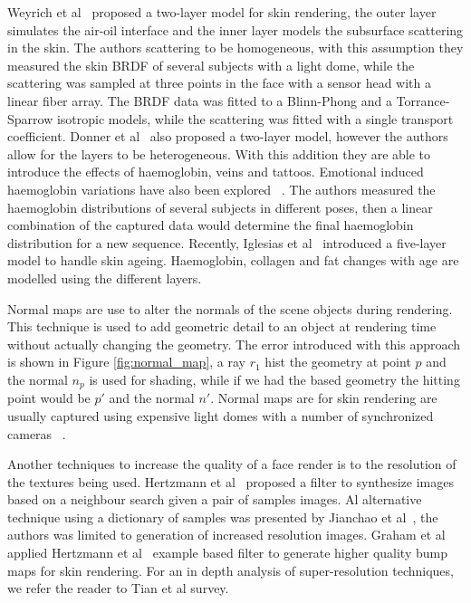 \documentclass[11pt]{report}
\begin{document}
Weyrich et al~\cite{Weyrich2006} proposed a two-layer model for skin rendering, the outer layer simulates the air-oil interface and the inner layer models the subsurface scattering in the skin.
The authors scattering to be homogeneous, with this assumption they measured the skin BRDF of several subjects with a light dome, while the scattering was sampled at three points in the face with a sensor head with a linear fiber array.
The BRDF data was fitted to a Blinn-Phong and a Torrance-Sparrow isotropic models, while the scattering was fitted with a single transport coefficient.
Donner et al~\cite{Donner2008} also proposed a two-layer model, however the authors allow for the layers to be heterogeneous.
With this addition they are able to introduce the effects of haemoglobin, veins and tattoos.
Emotional induced haemoglobin variations have also been explored ~\cite{Jimenez2010}.
The authors measured the haemoglobin distributions of several subjects in different poses, then a linear combination of the captured data would determine the final haemoglobin distribution for a new sequence.
Recently, Iglesias et al~\cite{Iglesias2015} introduced a five-layer model to handle skin ageing.
Haemoglobin, collagen and fat changes with age are modelled using the different layers.

Normal maps are use to alter the normals of the scene objects during rendering.
This technique is used to add geometric detail to an object at rendering time without actually changing the geometry.
The error introduced with this approach is shown in Figure \ref{fig:normal_map}, a ray $r_1$ hist the geometry at point $p$ and the normal $n_p$ is used for shading, while if we had the based geometry the hitting point would be $p'$ and the normal $n'$.
Normal maps are for skin rendering are usually captured using expensive light domes with a number of synchronized cameras ~\cite{Graham2013, Weyrich2006}. 

Another techniques to increase the quality of a face render is to the resolution of the textures being used.
Hertzmann et al~\cite{Hertzmann2001} proposed a filter to synthesize images based on a neighbour search given a pair of samples images.
Al alternative technique using a dictionary of samples was presented by Jianchao et al~\cite{Jianchao2010}, the authors was limited to generation of increased resolution images.
Graham et al~\cite{Graham2013} applied Hertzmann et al~\cite{Hertzmann2001} example based filter to generate higher quality bump maps for skin rendering.
For an in depth analysis of super-resolution techniques, we refer the reader to Tian et al \cite{Tian2011} survey.
\end{document}
